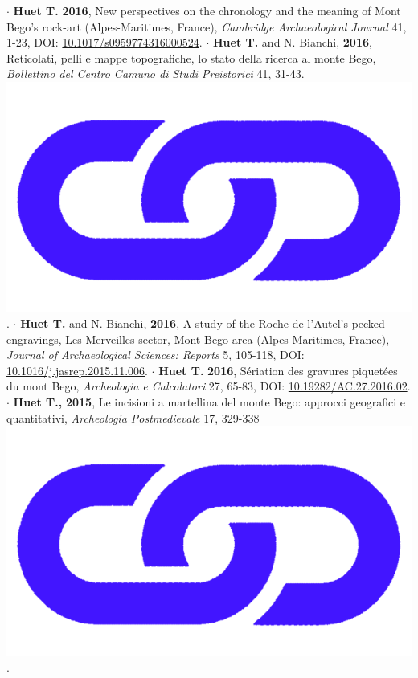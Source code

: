 \documentclass{article}
\begin{document}
$\cdot$ \textbf{Huet T.} \textbf{2016}, New perspectives on the chronology and the meaning of Mont Bego's rock-art (Alpes-Maritimes, France), \textit{Cambridge Archaeological Journal} 41, 1-23, DOI: \href{https://doi.org/10.1017/s0959774316000524}{10.1017/s0959774316000524}.
\smallbreak
$\cdot$ \textbf{Huet T.} and N. Bianchi, \textbf{2016}, Reticolati, pelli e mappe topografiche, lo stato della ricerca al monte Bego, \textit{Bollettino del Centro Camuno di Studi Preistorici} 41, 31-43. \href{https://www.researchgate.net/publication/358896027_Reticolati_pelli_e_mappe_topografiche}{\includegraphics[scale=0.02]{link_darkblue.png}}.
\smallbreak
$\cdot$ \textbf{Huet T.} and N. Bianchi, \textbf{2016}, A study of the Roche de l'Autel's pecked engravings, Les Merveilles sector, Mont Bego area (Alpes-Maritimes, France), \textit{Journal of Archaeological Sciences: Reports} 5, 105-118, DOI: \href{https://doi.org/10.1016/j.jasrep.2015.11.006}{10.1016/j.jasrep.2015.11.006}.
\smallbreak
$\cdot$ \textbf{Huet T.} \textbf{2016}, S\'{e}riation des gravures piquet\'{e}es du mont Bego, \textit{Archeologia e Calcolatori} 27, 65-83, DOI: \href{https://doi.org/10.19282/AC.27.2016.02}{10.19282/AC.27.2016.02}.
\smallbreak
$\cdot$ \textbf{Huet T.,} \textbf{2015}, Le incisioni a martellina del monte Bego: approcci geografici e quantitativi, \textit{Archeologia Postmedievale} 17, 329-338 \href{https://www.insegnadelgiglio.it/wp-content/uploads/2015/01/APM_17_libro-anteprima.pdf}{\includegraphics[scale=0.02]{link_darkblue.png}}.
\end{document}
